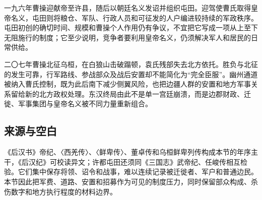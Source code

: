 一九六年曹操迎献帝至许县，随后以朝廷名义发诏并组织屯田。迎驾使曹氏取得皇帝名义，屯田则将粮仓、军队、行政人员和可征发的人户编进较持续的军政秩序。屯田初创的确切时间、规模和曹操个人作用仍有争议，不宜把它写成一项从上至下无阻施行的制度；它至少说明，竞争者要利用皇帝名义，仍须解决军人和居民的日常供给。

二〇七年曹操北征乌桓，在白狼山击破蹋顿，袁氏残部失去北方依托。胜负与北征的发生可靠，行军路线、参战部众及战后安置却不能简化为“完全臣服”。幽州通道被纳入曹氏控制，既为此后南下减少侧翼风险，也把边疆人群的安置和地方军事关系留给新的北方政权处理。东汉终局由此不是单一宫廷崩溃，而是边郡财政、迁徙、军事集团与皇帝名义被不同力量重新组合。

\subsection{来源与空白}

《后汉书》帝纪、〈西羌传〉、〈鲜卑传〉、董卓传和乌桓鲜卑列传构成本节的年序主干，《后汉纪》可校读异文；许都屯田还须同《三国志》武帝纪、任峻传相互检验。它们集中保存将领、诏令和战事，难以连续记录被迁徙者、军户和普通边民。本节因此把军费、道路、安置和招募作为可见的制度压力，同时保留部众构成、杀伤数字和地方执行程度的材料边界。

